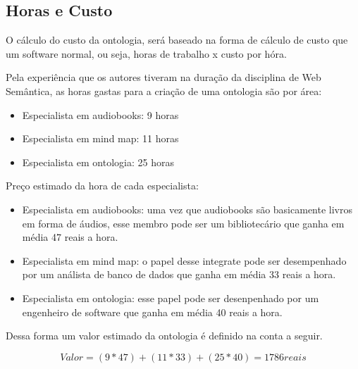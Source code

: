 \subsection{Horas e Custo}

O cálculo do custo da ontologia, será baseado na forma de cálculo de custo que um software normal, ou seja, horas de trabalho x custo por hóra.

Pela experiência que os autores tiveram na duração da disciplina de Web Semântica, as horas gastas para a criação de uma ontologia são por área:

\begin{itemize}
	\item Especialista em audiobooks: 9 horas
	\item Especialista em mind map: 11 horas
	\item Especialista em ontologia: 25 horas
\end{itemize}

Preço estimado da hora de cada especialista: 

\begin{itemize}
	\item Especialista em audiobooks: uma vez que audiobooks são basicamente livros em forma de áudios, esse membro pode ser um bibliotecário que ganha em média 47 reais a hora. \cite{bibliotecaria}
	\item Especialista em mind map: o papel desse integrate pode ser desempenhado por um análista de banco de dados que ganha em média 33 reais a hora.\cite{profissionaisti}
	\item Especialista em ontologia: esse papel pode ser desenpenhado por um engenheiro de software que ganha em média 40 reais a hora. \cite{profissionaisti}
\end{itemize}

Dessa forma um valor estimado da ontologia é definido na conta a seguir.

\begin{equation}
Valor = (9 * 47) + (11 * 33) + (25 * 40) = 1786 reais
\end{equation} 




